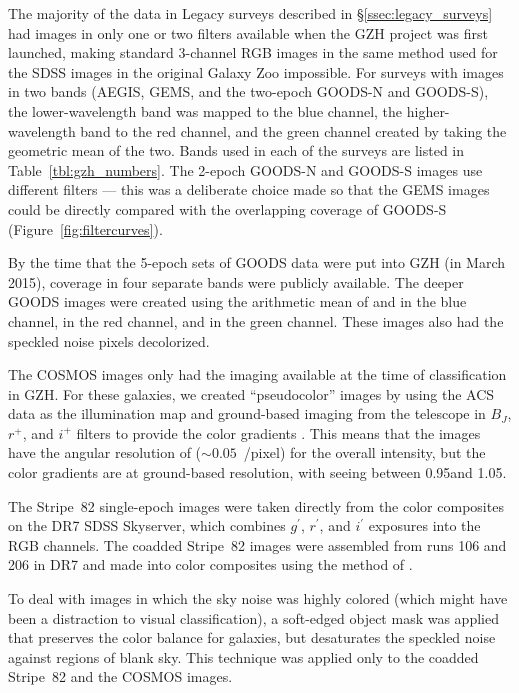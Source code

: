 \documentclass[twocolumn]{aastex6}
\begin{document}
The majority of the data in Legacy surveys described in \S\ref{ssec:legacy_surveys} had images in only one or two filters available when the GZH project was first launched, making standard 3-channel RGB images in the same method used for the SDSS images in the original Galaxy Zoo impossible. For surveys with images in two bands (AEGIS, GEMS, and the two-epoch GOODS-N and GOODS-S), the lower-wavelength band was mapped to the blue channel, the higher-wavelength band to the red channel, and the green channel created by taking the geometric mean of the two. Bands used in each of the surveys are listed in Table~\ref{tbl:gzh_numbers}. The 2-epoch GOODS-N and GOODS-S images use different filters --- this was a deliberate choice made so that the GEMS images could be directly compared with the overlapping coverage of GOODS-S (Figure~\ref{fig:filtercurves}). 

By the time that the 5-epoch sets of GOODS data were put into GZH (in March 2015), coverage in four separate \hst{} bands were publicly available. The deeper GOODS images were created using the arithmetic mean of \Bband{} and \Vband{} in the blue channel, \Iband{} in the red channel, and \zband{} in the green channel. These images also had the speckled noise pixels decolorized. 

The COSMOS images only had the \Iband{} imaging available at the time of classification in GZH. For these galaxies, we created ``pseudocolor'' images by using the ACS \Iband{} data as the illumination map and ground-based imaging from the \subaru{} telescope in $B_J$, $r^+$, and $i^+$ filters to provide the color gradients \citep[see][for further details]{gri12}. This means that the images have the angular resolution of \hst{} ($\sim0.05$~\arcsec/pixel) for the overall intensity, but the color gradients are at ground-based resolution, with seeing between 0.95\arcsec and 1.05\arcsec \citep{tan07}.

The Stripe~82 single-epoch images were taken directly from the color composites on the DR7 SDSS Skyserver, which combines $g^{\prime}$, $r^{\prime}$, and $i^{\prime}$ exposures into the RGB channels. The coadded Stripe~82 images were assembled from runs 106 and 206 in DR7 and made into color composites using the method of \citet{lup04}.

To deal with images in which the sky noise was highly colored (which might have been a distraction to visual classification), a soft-edged object mask was applied that preserves the color balance for galaxies, but desaturates the speckled noise against regions of blank sky. This technique was applied only to the coadded Stripe~82 and the COSMOS images.
\end{document}
